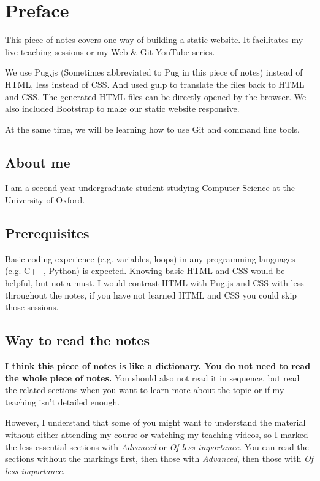 \chapter*{Preface}

This piece of notes covers one way of building a static website. It facilitates my live teaching sessions or my Web \& Git YouTube series.
\vspace{6mm}

We use Pug.js (Sometimes abbreviated to Pug in this piece of notes) instead of HTML, less instead of CSS. And used gulp to translate the files back to HTML and CSS. The generated HTML files can be directly opened by the browser. We also included Bootstrap to make our static website responsive.

At the same time, we will be learning how to use Git and command line tools.

\section{About me}

I am a second-year undergraduate student studying Computer Science at the University of Oxford.

\section{Prerequisites}

Basic coding experience (e.g. variables, loops) in any programming languages (e.g. C++, Python) is expected. Knowing basic HTML and CSS would be helpful, but not a must. I would contrast HTML with Pug.js and CSS with less throughout the notes, if you have not learned HTML and CSS you could skip those sessions.

\section{Way to read the notes}

\textbf{I think this piece of notes is like a dictionary. You do not need to read the whole piece of notes.} You should also not read it in sequence, but read the related sections when you want to learn more about the topic or if my teaching isn't detailed enough. 
\vspace{6mm}

However, I understand that some of you might want to understand the material without either attending my course or watching my teaching videos, so I marked the less essential sections with \textit{Advanced} or \textit{Of less importance}. You can read the sections without the markings first, then those with \textit{Advanced}, then those with \textit{Of less importance}.

